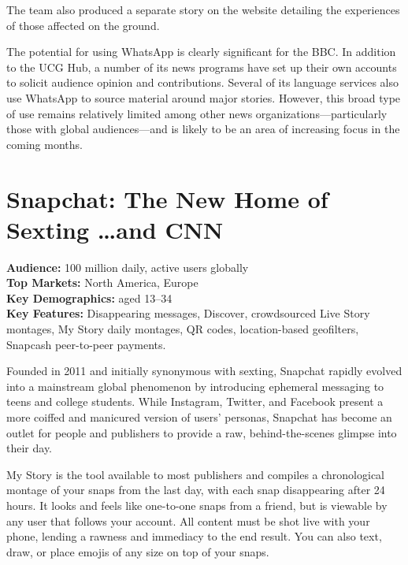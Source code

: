 \documentclass[notoc, symmetric, nobib, nols]{towcenter-guideto-book}
\begin{document}
The team also produced a separate story on the website detailing the experiences of those affected on the ground.\autocite{BBCNepal}


The potential for using WhatsApp is clearly significant for the BBC. In addition to the UCG Hub, a number of its news programs have set up their own accounts to solicit audience opinion and contributions. Several of its language services also use WhatsApp to source material around major stories. However, this broad type of use remains relatively limited among other news organizations---particularly those with global audiences---and is likely to be an area of increasing focus in the coming months.

\newpage
\section[Snapchat: The New Home of Sexting \ldots and CNN]{Snapchat: The New Home of Sexting \ldots \protect\newline and CNN} 

\begin{framed}
\noindent\textbf{Audience:} 100 million daily, active users globally\\
\noindent\textbf{Top Markets:} North America, Europe\\
\noindent\textbf{Key Demographics:} aged 13--34\\
\noindent\textbf{Key Features:} Disappearing messages, Discover, crowdsourced Live Story montages, My Story daily montages, QR codes, location-based geofilters, Snapcash peer-to-peer payments.
\end{framed}
\vspace{\baselineskip}
Founded in 2011 and initially synonymous with sexting,\autocite{FCSnapchat} Snapchat rapidly evolved into a mainstream global phenomenon by introducing ephemeral messaging to teens and college students.  While Instagram, Twitter, and Facebook present a more coiffed and manicured version of users' personas, Snapchat has become an outlet for people and publishers to provide a raw, behind-the-scenes glimpse into their day.

My Story is the tool available to most publishers and compiles a chronological montage of your snaps from the last day, with each snap disappearing after 24 hours. It looks and feels like one-to-one snaps from a friend, but is viewable by any user that follows your account. All content must be shot live with your phone, lending a rawness and immediacy to the end result. You can also text, draw, or place emojis of any size on top of your snaps.
\end{document}
